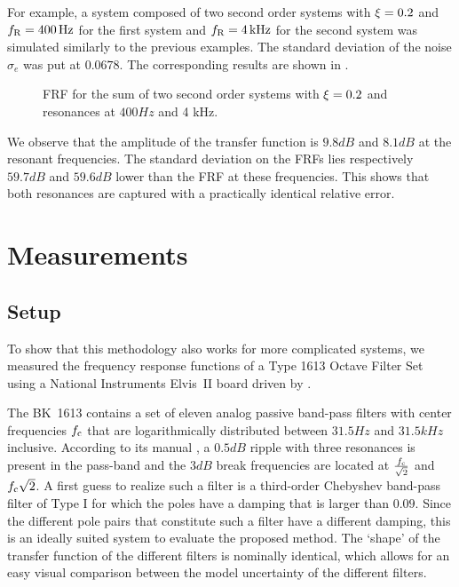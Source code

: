 For example, a system composed of two second order systems with $\xi = 0.2$ and $f_{\mathrm{R}} = 400 \,\mathrm{Hz}$ for the first system and $f_{\mathrm{R}}=4 \,\mathrm{kHz}$ for the second system was simulated similarly to the previous examples. The standard deviation of the noise $\sigma_e$ was put at $0.0678$. The corresponding results are  shown in .

\begin{figure}%
  \centering
  \setlength{\figurewidth}{0.8\columnwidth}
  \setlength{\figureheight}{5cm}
  
  \caption{FRF for the sum of two second order systems with $\xi=0.2$ and
           resonances at $ 400 \unit{Hz}$ and 4 \unit{kHz}.}%
  \label{fig:sumSys}
\end{figure}

We observe that the amplitude of the transfer function is $9.8\unit{dB}$ and $8.1\unit{dB}$ at the resonant frequencies.
The standard deviation on the \glspl{FRF} lies respectively $59.7 \unit{dB}$ and $59.6 \unit{dB}$ lower than the \gls{FRF} at these frequencies. 
This shows that both resonances are captured with a practically identical relative error.
  
\section{Measurements} \label{sec:measurement}
  \subsection{Setup}
    To show that this methodology also works for more complicated systems, we measured the frequency response functions of a \bruelkjaer Type 1613 Octave Filter Set using a National Instruments Elvis~II board driven by \labview.
    
    The BK~1613 contains a set of eleven analog passive band-pass filters with center frequencies $f_{\mathrm{c}}$ that are logarithmically distributed between $31.5\unit{Hz}$ and $31.5\unit{kHz}$ inclusive.
    According to its manual \citep{datasheet_bk1613}, a $0.5\unit{dB}$ ripple with three resonances is present in the pass-band and the $3\unit{dB}$ break frequencies are located at $\frac{f_{\mathrm{c}}}{\sqrt{2}}$ and $f_{\mathrm{c}} \sqrt{2}$.
    A first guess to realize such a filter is a third-order Chebyshev band-pass filter of Type I \citep{Zverev1967} for which the poles have a damping that is larger than $0.09$.
    Since the different pole pairs that constitute such a filter have a different damping, this is an ideally suited system to evaluate the proposed method.
    The `shape' of the transfer function of the different filters is nominally identical, which allows for an easy visual comparison between the model uncertainty of the different filters.

